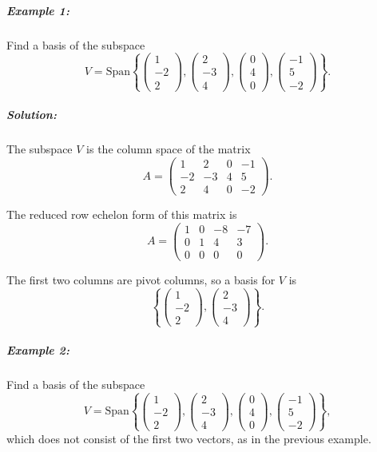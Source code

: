 \documentclass[a4paper,12pt]{article}
\begin{document}
\subparagraph{Example 1:}Find a basis of the subspace 
\[
V = \text{Span} \left\{ 
\begin{pmatrix} 1 \\ -2 \\ 2 \end{pmatrix},
\begin{pmatrix} 2 \\ -3 \\ 4 \end{pmatrix},
\begin{pmatrix} 0 \\ 4 \\ 0 \end{pmatrix},
\begin{pmatrix} -1 \\ 5 \\ -2 \end{pmatrix}
\right\}.
\]

\subparagraph{Solution:}

The subspace \( V \) is the column space of the matrix
\[
A = \begin{pmatrix}
1 & 2 & 0 & -1 \\
-2 & -3 & 4 & 5 \\
2 & 4 & 0 & -2
\end{pmatrix}.
\]

The reduced row echelon form of this matrix is
\[
A = \begin{pmatrix}
1 & 0 & -8 & -7 \\
0 & 1 & 4 & 3 \\
0 & 0 & 0 & 0
\end{pmatrix}.
\]

The first two columns are pivot columns, so a basis for \( V \) is
\[
\left\{ 
\begin{pmatrix} 1 \\ -2 \\ 2 \end{pmatrix},
\begin{pmatrix} 2 \\ -3 \\ 4 \end{pmatrix}
\right\}.
\]


\subparagraph{Example 2:}Find a basis of the subspace 
\[
V = \text{Span} \left\{ 
\begin{pmatrix} 1 \\ -2 \\ 2 \end{pmatrix},
\begin{pmatrix} 2 \\ -3 \\ 4 \end{pmatrix},
\begin{pmatrix} 0 \\ 4 \\ 0 \end{pmatrix},
\begin{pmatrix} -1 \\ 5 \\ -2 \end{pmatrix}
\right\},
\]
which does not consist of the first two vectors, as in the previous example.
\end{document}
